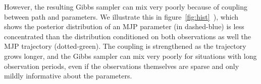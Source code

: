   However, the resulting Gibbs sampler can mix very poorly because of coupling between path and parameters.
  We illustrate this in figure~\ref{fig:hist}~\citep[inspired by][]{papaspiliopoulos2007general}), which shows the posterior distribution of an MJP parameter (in dashed-blue) is less concentrated than the distribution conditioned on both observations as well the MJP trajectory (dotted-green). 
The coupling is strengthened as the trajectory grows longer, and the Gibbs sampler can mix very poorly for situations with long observation periods, even if the observations themselves are sparse and only mildly informative about the parameters.


